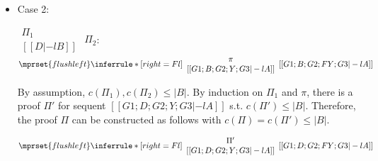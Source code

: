 \begin{itemize}
\item Case 2:
      \begin{center}
        \scriptsize
        \begin{math}
          \begin{array}{c}
            \Pi_1 \\
            {[[D |-l B]]}
          \end{array}
        \end{math}
        \qquad\qquad
        $\Pi_2$:
        \begin{math}
          $$\mprset{flushleft}
          \inferrule* [right={\tiny Fl}] {
            {
              \begin{array}{c}
                \pi \\
                {[[G1; B; G2; Y; G3 |-l A]]}
              \end{array}
            }
          }{[[G1; B; G2; F Y; G3 |-l A]]}
        \end{math}
      \end{center}
      By assumption, $c(\Pi_1),c(\Pi_2)\leq |B|$. By induction on $\Pi_1$
      and $\pi$, there is a proof $\Pi'$ for sequent
      $[[G1; D; G2; Y; G3 |-l A]]$ s.t. $c(\Pi') \leq |B|$. Therefore, the
      proof $\Pi$ can be constructed as follows with
      $c(\Pi) = c(\Pi') \leq |B|$.
      \begin{center}
        \scriptsize
        \begin{math}
          $$\mprset{flushleft}
          \inferrule* [right={\tiny Fl}] {
            {
              \begin{array}{c}
                \Pi' \\
                {[[G1; D; G2; Y; G3 |-l A]]}
              \end{array}
            }
          }{[[G1; D; G2; F Y; G3 |-l A]]}
        \end{math}
      \end{center}


\end{itemize}
